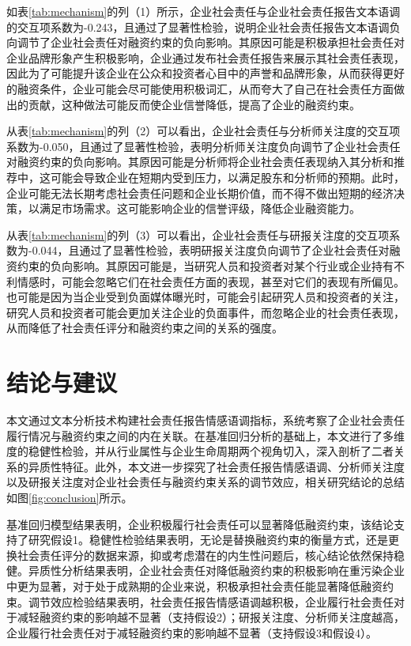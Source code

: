 \documentclass[12pt,a4paper]{article}
\begin{document}
如表\ref{tab:mechanism}的列（1）所示，企业社会责任与企业社会责任报告文本语调的交互项系数为-0.243，且通过了显著性检验，说明企业社会责任报告文本语调负向调节了企业社会责任对融资约束的负向影响。其原因可能是积极承担社会责任对企业品牌形象产生积极影响，企业通过发布社会责任报告来展示其社会责任表现，因此为了可能提升该企业在公众和投资者心目中的声誉和品牌形象，从而获得更好的融资条件，企业可能会尽可能使用积极词汇，从而夸大了自己在社会责任方面做出的贡献，这种做法可能反而使企业信誉降低，提高了企业的融资约束。

从表\ref{tab:mechanism}的列（2）可以看出，企业社会责任与分析师关注度的交互项系数为-0.050，且通过了显著性检验，表明分析师关注度负向调节了企业社会责任对融资约束的负向影响。其原因可能是分析师将企业社会责任表现纳入其分析和推荐中，这可能会导致企业在短期内受到压力，以满足股东和分析师的预期。此时，企业可能无法长期考虑社会责任问题和企业长期价值，而不得不做出短期的经济决策，以满足市场需求。这可能影响企业的信誉评级，降低企业融资能力。

从表\ref{tab:mechanism}的列（3）可以看出，企业社会责任与研报关注度的交互项系数为-0.044，且通过了显著性检验，表明研报关注度负向调节了企业社会责任对融资约束的负向影响。其原因可能是，当研究人员和投资者对某个行业或企业持有不利情感时，可能会忽略它们在社会责任方面的表现，甚至对它们的表现有所偏见。也可能是因为当企业受到负面媒体曝光时，可能会引起研究人员和投资者的关注，研究人员和投资者可能会更加关注企业的负面事件，而忽略企业的社会责任表现，从而降低了社会责任评分和融资约束之间的关系的强度。

\section{结论与建议}

本文通过文本分析技术构建社会责任报告情感语调指标，系统考察了企业社会责任履行情况与融资约束之间的内在关联。在基准回归分析的基础上，本文进行了多维度的稳健性检验，并从行业属性与企业生命周期两个视角切入，深入剖析了二者关系的异质性特征。此外，本文进一步探究了社会责任报告情感语调、分析师关注度以及研报关注度对企业社会责任与融资约束关系的调节效应，相关研究结论的总结如图\ref{fig:conclusion}所示。

基准回归模型结果表明，企业积极履行社会责任可以显著降低融资约束，该结论支持了研究假设1。稳健性检验结果表明，无论是替换融资约束的衡量方式，还是更换社会责任评分的数据来源，抑或考虑潜在的内生性问题后，核心结论依然保持稳健。异质性分析结果表明，企业社会责任对降低融资约束的积极影响在重污染企业中更为显著，对于处于成熟期的企业来说，积极承担社会责任能显著降低融资约束。调节效应检验结果表明，社会责任报告情感语调越积极，企业履行社会责任对于减轻融资约束的影响越不显著（支持假设2）；研报关注度、分析师关注度越高，企业履行社会责任对于减轻融资约束的影响越不显著（支持假设3和假设4）。
\end{document}
